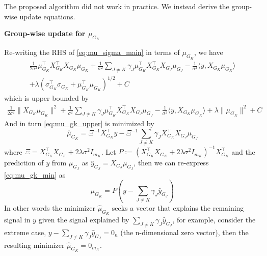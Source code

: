 \documentclass[12pt]{article}
\begin{document}
The proposed algorithm did not work in practice. We instead derive the group-wise update equations.

\textbf{Group-wise update for $\mu_{G_K}$}

Re-writing the RHS of \eqref{eq:mu_sigma_main} in terms of $\mu_{G_K}$, we have
\begin{equation} \label{eq:mu_gk}
\begin{aligned}
    \frac{1}{2\sigma^2} 
    \mu_{G_K}^\top X_{G_K}^\top X_{G_K} \mu_{G_K}
+
    \frac{1}{\sigma^2} 
    \sum_{J \neq K} 
	\gamma_J \mu_{G_K}^\top X_{G_K}^\top X_{G_J} \mu_{G_J} 
-
    \frac{1}{\sigma^2}
    \langle y, X_{G_K} \mu_{G_K} \rangle \\
+
    \lambda \left( \sigma_{G_K}^\top \sigma_{G_K} + \mu_{G_K}^\top \mu_{G_K} \right)^{1/2} + C
\end{aligned}
\end{equation}
which is upper bounded by
\begin{equation} \label{eq:mu_gk_upper}
\begin{aligned}
    \frac{1}{2\sigma^2} 
    \| X_{G_K} \mu_{G_K} \|^2
+
    \frac{1}{\sigma^2} 
    \sum_{J \neq K} 
	\gamma_J \mu_{G_K}^\top X_{G_K}^\top X_{G_J} \mu_{G_J} 
-
    \frac{1}{\sigma^2}
    \langle y, X_{G_K} \mu_{G_K} \rangle
+
    \lambda \| \mu_{G_K} \|^2 + C
\end{aligned}
\end{equation}
And in turn \eqref{eq:mu_gk_upper} is minimized by
\begin{equation} \label{eq:mu_gk_min}
    \hat{\mu}_{G_K} = \Xi^{-1} X_{G_K}^\top y - \Xi^{-1} \sum_{J \neq K} \gamma_J X_{G_K}^\top X_{G_J} \mu_{G_J}    
\end{equation}
where $\Xi = X_{G_K}^\top X_{G_K} + 2 \lambda \sigma^2 I_{m_K}$. Let $P := (X_{G_K}^\top X_{G_K} + 2 \lambda \sigma^2 I_{m_K})^{-1} X_{G_K}^\top $ and the prediction of $y$ from $\mu_{G_J}$ as $\hat{y}_{G_J} = X_{G_J} \mu_{G_J}$, then we can re-express \eqref{eq:mu_gk_min} as
\begin{equation}
\hat{\mu}_{G_K} = P(y - \sum_{J \neq K} \gamma_J \hat{y}_{G_J})
\end{equation}
In other words the minimizer $\hat{\mu}_{G_K}$ seeks a vector that explains the remaining signal in $y$ given the signal explained by $\sum_{J \neq K} \gamma_J \hat{y}_{G_J}$, for example, consider the extreme case, $y - \sum_{J \neq K} \gamma_J \hat{y}_{G_J} = 0_n$ (the n-dimensional zero vector), then the resulting minimizer $\hat{\mu}_{G_K} = 0_{m_K}$. 
\end{document}

